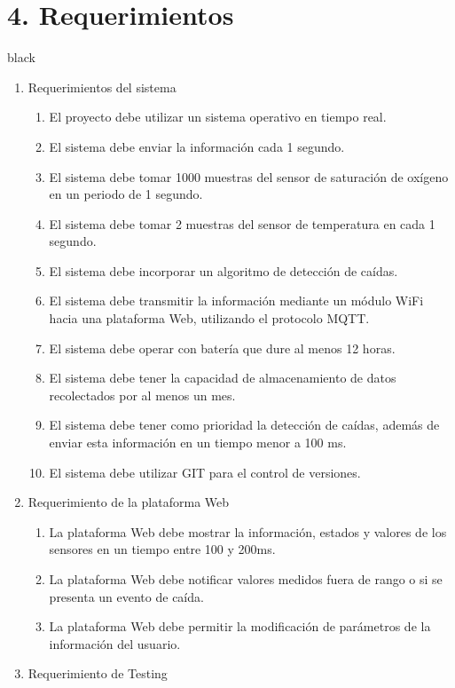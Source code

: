 \documentclass[11pt]{charter}
\begin{document}
\section{4. Requerimientos}
\label{sec:requerimientos}

\begin{consigna}{black}
\vspace{-35px}
\begin{enumerate}
\item Requerimientos del sistema
	\begin{enumerate}
	\item El proyecto debe utilizar un sistema operativo en tiempo real.
	\item El sistema debe enviar la información cada 1 segundo.
	\item El sistema debe tomar 1000 muestras del sensor de saturación de oxígeno en un periodo de 1 segundo.
	\item El sistema debe tomar 2 muestras del sensor de temperatura en cada 1 segundo. 
	\item El sistema debe incorporar un algoritmo de detección de caídas.
	\item El sistema debe transmitir la información mediante un módulo WiFi hacia una plataforma Web, utilizando el protocolo MQTT.
	\item El sistema debe operar con batería que dure al menos 12 horas.
	\item El sistema debe tener la capacidad de almacenamiento de datos recolectados por al menos un mes. 
	\item El sistema debe tener como prioridad la detección de caídas, además de enviar esta información en un tiempo menor a 100 ms.
	\item El sistema debe utilizar GIT para el control de versiones.
	\end{enumerate}
\item Requerimiento de la plataforma Web
	\begin{enumerate}
	\item La plataforma Web debe mostrar la información, estados y valores de los sensores en un tiempo entre 100 y 200ms.
	\item La plataforma Web debe notificar valores medidos fuera de rango o si se presenta un evento de caída.
	\item La plataforma Web debe permitir la modificación de parámetros de la información del usuario.
	\end{enumerate}
\item Requerimiento de Testing 

\end{enumerate}
\end{consigna}
\end{document}

